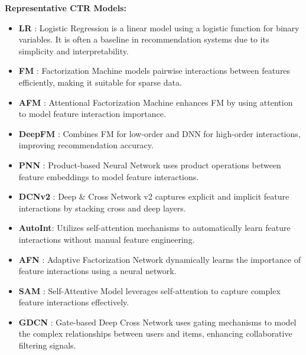 \textbf{Representative CTR Models:}
    \begin{itemize}[leftmargin=*,align=left]
        \item \textbf{LR} \cite{LR}: Logistic Regression is a linear model using a logistic function for binary variables. It is often a baseline in recommendation systems due to its simplicity and interpretability.
        \item \textbf{FM} \cite{FM}: Factorization Machine models pairwise interactions between features efficiently, making it suitable for sparse data.
        \item \textbf{AFM} \cite{AFM}: Attentional Factorization Machine enhances FM by using attention to model feature interaction importance.
        \item \textbf{DeepFM} \cite{DeepFM}: Combines FM for low-order and DNN for high-order interactions, improving recommendation accuracy.
            \item \textbf{PNN} \cite{PNN}: Product-based Neural Network uses product operations between feature embeddings to model feature interactions.
            \item \textbf{DCNv2} \cite{DCNv2}: Deep \& Cross Network v2 captures explicit and implicit feature interactions by stacking cross and deep layers.
            \item \textbf{AutoInt}\cite{AutoInt}: Utilizes self-attention mechanisms to automatically learn feature interactions without manual feature engineering.
            \item \textbf{AFN} \cite{AFN}: Adaptive Factorization Network dynamically learns the importance of feature interactions using a neural network.
            \item \textbf{SAM} \cite{SAM}: Self-Attentive Model leverages self-attention to capture complex feature interactions effectively.
            \item \textbf{GDCN} \cite{GDCN}: Gate-based Deep Cross Network uses gating mechanisms to model the complex relationships between users and items, enhancing collaborative filtering signals.
        \end{itemize}
              
